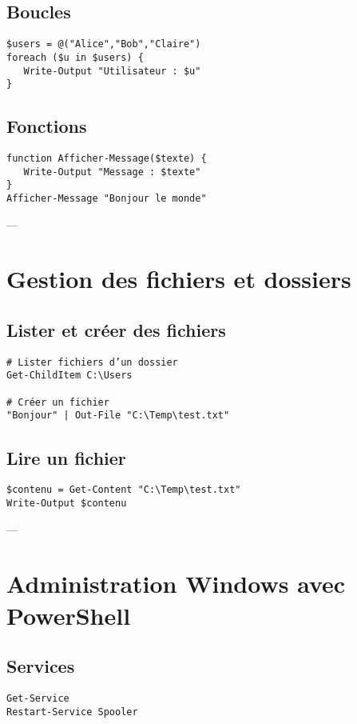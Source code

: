 \documentclass[a4paper,12pt]{article}
\begin{document}
\subsection{Boucles}
\begin{verbatim}
$users = @("Alice","Bob","Claire")
foreach ($u in $users) {
   Write-Output "Utilisateur : $u"
}
\end{verbatim}

\subsection{Fonctions}
\begin{verbatim}
function Afficher-Message($texte) {
   Write-Output "Message : $texte"
}
Afficher-Message "Bonjour le monde"
\end{verbatim}

---

\section{Gestion des fichiers et dossiers}
\subsection{Lister et créer des fichiers}
\begin{verbatim}
# Lister fichiers d’un dossier
Get-ChildItem C:\Users

# Créer un fichier
"Bonjour" | Out-File "C:\Temp\test.txt"
\end{verbatim}

\subsection{Lire un fichier}
\begin{verbatim}
$contenu = Get-Content "C:\Temp\test.txt"
Write-Output $contenu
\end{verbatim}

---

\section{Administration Windows avec PowerShell}
\subsection{Services}
\begin{verbatim}
Get-Service
Restart-Service Spooler
\end{verbatim}
\end{document}
